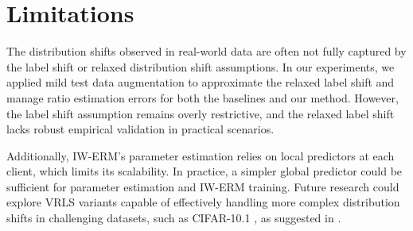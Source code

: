 \section{Limitations}\label{app:limitations}

The distribution shifts observed in real-world data are often not fully captured by the label shift or relaxed distribution shift assumptions. In our experiments, we applied mild test data augmentation to approximate the relaxed label shift and manage ratio estimation errors for both the baselines and our method. However, the label shift assumption remains overly restrictive, and the relaxed label shift lacks robust empirical validation in practical scenarios.

Additionally, IW-ERM’s parameter estimation relies on local predictors at each client, which limits its scalability. In practice, a simpler global predictor could be sufficient for parameter estimation and IW-ERM training. Future research could explore VRLS variants capable of effectively handling more complex distribution shifts in challenging datasets, such as CIFAR-10.1 \citep{recht2018cifar10_1, torralba2008tinyimages}, as suggested in \citep{rls}.

